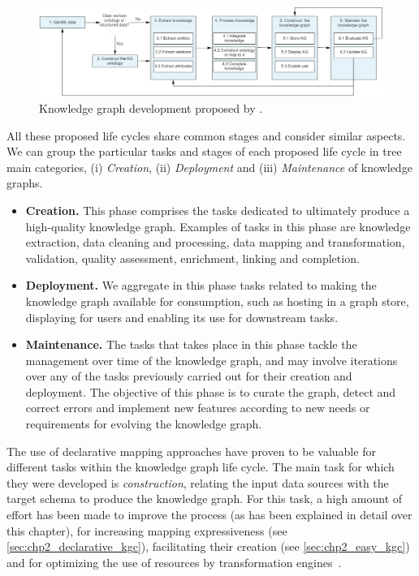 \begin{figure}[]
\centering
\includegraphics[width=\linewidth]{figures/chp2_kg-dev-process.png}
\caption{Knowledge graph development proposed by \cite{tamavsauskaite2023defining}.}
\label{fig:chp2_kg-dev-process}
\end{figure}

All these proposed life cycles share common stages and consider similar aspects. We can group the particular tasks and stages of each proposed life cycle in tree main categories, (i) \textit{Creation}, (ii) \textit{Deployment} and (iii) \textit{Maintenance} of knowledge graphs. 
\begin{itemize}
    \item \textbf{Creation.} This phase comprises the tasks dedicated to ultimately produce a high-quality knowledge graph. Examples of tasks in this phase are knowledge extraction, data cleaning and processing, data mapping and transformation, validation, quality assessment, enrichment, linking and completion.

    \item \textbf{Deployment.} We aggregate in this phase tasks related to making the knowledge graph available for consumption, such as hosting in a graph store, displaying for users and enabling its use for downstream tasks. 

    \item \textbf{Maintenance.} The tasks that takes place in this phase tackle the management over time of the knowledge graph, and may involve iterations over any of the tasks previously carried out for their creation and deployment. The objective of this phase is to curate the graph, detect and correct errors and implement new features according to new needs or requirements for evolving the knowledge graph.
\end{itemize}

The use of declarative mapping approaches have proven to be valuable for different tasks within the knowledge graph life cycle. The main task for which they were developed is \textit{construction}, relating the input data sources with the target schema to produce the knowledge graph. For this task, a high amount of effort has been made to improve the process (as has been explained in detail over this chapter), for increasing mapping expressiveness (see \cref{sec:chp2_declarative_kgc}), facilitating their creation (see \cref{sec:chp2_easy_kgc}) and for optimizing the use of resources by transformation engines~\parencite{arenas2022morphkgc,iglesias2023scaling,xiao2020virtual,iglesias2022empowering,jozashoori2019mapsdi}. 

